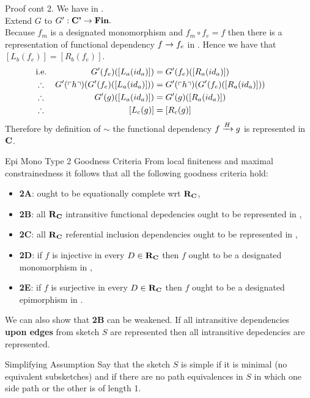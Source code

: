 \begin{frame}{Proof cont 2.}
We have   in \catcp.\\
\medskip
Extend $G$ to $G':\catcp \morph \Fin.$ \\
Because $f_m$ is a designated monomorphism and $f_m \circ f_e = f$ then
there is a representation of functional dependency $f \morph f_e$ in \catc.
Hence  we have that $[L_b(f_e)]= [R_b(f_e)]$.
\medskip
\begin{align*}
&\mbox{i.e.}& G'(f_e)([L_a(id_a)])              &= G'(f_e)([R_a(id_a)])       \\
&\therefore & G'(\qq{h}) (G'(f_e)([L_a(id_a)])) &= G'(\qq{h}) (G'(f_e)([R_a(id_a)])) \\
&\therefore & G'(g)([L_a(id_a)])              &= G'(g)([R_a(id_a)]) & &    \\
&\therefore & [L_c(g)] &= [R_c(g)] 
\end{align*}
Therefore by definition of $\sim$ the functional dependency
$\fundep{H}{f}{g}$ is represented in $\catc$.
\end{frame}

\begin{frame}{Epi Mono Type 2 Goodness Criteria}
From local finiteness and maximal constrainedness it follows that all the following goodness criteria hold: 
\begin{itemize}
\item \textbf{2A}:  \catcw ought to be equationally complete wrt $\reqtc$,         
\item \textbf{2B}:  all $\reqtc$ intransitive functional depedencies ought to be represented in \catc,
\item \textbf{2C}:  all $\reqtc$ referential inclusion dependencies ought to be represented in \catc, 
\pause \item \textbf{2D}:  if $f$ is injective in every $D \in \reqtc$ then $f$ ought to be a designated monomorphism in \catc,
\pause \item \textbf{2E}:  if $f$ is surjective in every $D \in \reqtc$ then $f$ ought to be a designated epimorphism in \catc.
\end{itemize}
We can also show that \textbf{2B} can be weakened. If all intransitive dependencies \textbf{upon edges} from sketch $S$ are represented then 
all intransitive depedencies are represented.
\end{frame}

\begin{frame}{Simplifying Assumption}
Say that the sketch $S$ is simple if it is minimal (no equivalent subsketches) and if there are no path equivalences in $S$ in which one side path or the other is of length 1.  
\end{frame}


